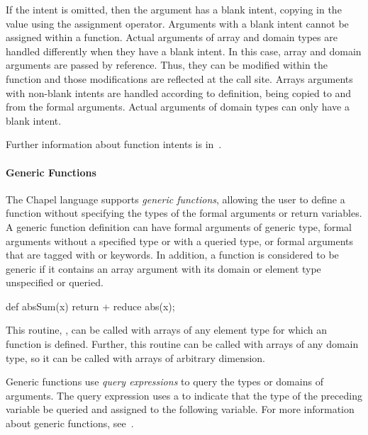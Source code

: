 If the intent is omitted, then the
argument has a blank intent, copying in the value using the assignment 
operator.  Arguments with a blank intent cannot be assigned within a function.
Actual arguments of array and domain types are handled differently when
they have a blank intent.  In this case, array and domain arguments are 
passed by reference.  Thus, they can be modified within the function and 
those modifications are reflected at the call site.  Arrays arguments 
with non-blank intents are handled according to definition, being copied 
to and from the formal arguments.  Actual arguments of domain types can
only have a blank intent.

Further information about function intents is in~.

\paragraph{Generic Functions}
The Chapel language supports \emph{generic functions}, allowing the user
to define a function without specifying the types of the formal arguments
or return variables.  A generic function definition can have formal arguments  
of generic type, formal arguments without a specified type or 
with a queried type, or formal arguments that are tagged with 
 or  keywords.  In addition, a function is
considered to be generic if it contains an array argument with its
domain or element type unspecified or queried.

\begin{example}
\begin{chapel}
def absSum(x) {
  return + reduce abs(x); 
}
\end{chapel}
This routine, , can be called
with arrays of any element type for which an  function is
defined.  Further, this routine can be called with arrays of 
any domain type, so it can be called with arrays of arbitrary dimension.
\end{example}

Generic functions use \emph{query expressions} to query the types
or domains of arguments.
The query expression uses a  to indicate that the type of the
preceding variable be queried and assigned to the following variable.
For more information about generic functions, see~.

